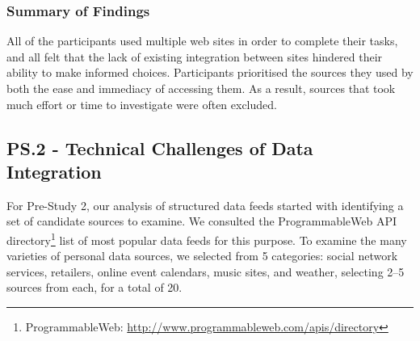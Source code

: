\documentclass{sigchi}
\begin{document}
\subsubsection{Summary of Findings}

All of the participants used multiple web sites in order to complete their tasks, and all felt that the lack of existing integration between sites hindered their ability to make informed choices. Participants prioritised the sources they used by both the ease and immediacy of accessing them.  As a result, sources that took much effort or time to investigate were often excluded.



\subsection{PS.2 - Technical Challenges of Data Integration}
For Pre-Study 2, our analysis of structured data feeds started with identifying a set of candidate sources to examine.  We consulted the ProgrammableWeb API directory\footnote{ProgrammableWeb: \url{http://www.programmableweb.com/apis/directory}} list of most popular data feeds for this purpose.  To examine the many varieties of personal data sources, we selected from 5 categories: social network services, retailers, online event calendars, music sites, and weather, selecting 2--5 sources from each, for a total of 20.  
\end{document}
